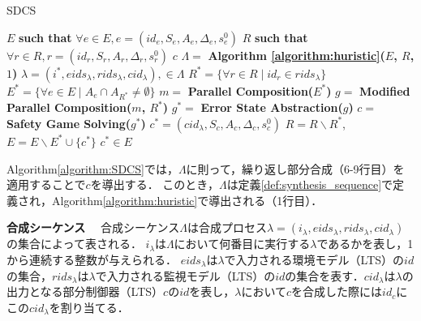 \begin{algorithm}[h]
\caption{SDCS}
\label{algorithm:SDCS}
\begin{algorithmic}[1]
\renewcommand{\algorithmicrequire}{\textbf{Input:}}
\renewcommand{\algorithmicensure}{\textbf{Output:}}
\REQUIRE $E$ {\bf such that} $\forall e \in E, e = (id_{e}, S_{e}, A_{e}, \Delta_{e}, s^0_{e})$
\REQUIRE $R$ {\bf such that} $\forall r \in R, r = (id_{r}, S_{r}, A_{r}, \Delta_{r}, s^0_{r})$
\ENSURE $c$
\STATE $\Lambda =$ {\bf Algorithm \ref{algorithm:huristic}($E$, $R$, $1$)}
    \STATE $\lambda = (i^*, eids_{\lambda}, rids_{\lambda}, cid_{\lambda}),  \in \Lambda$
    \STATE $R^* = \{\forall r \in R \mid id_{r} \in rids_{\lambda}\}$
    \STATE $E^* = \{\forall e \in E \mid A_{e} \cap A_{R^*} \neq \emptyset\}$
    \STATE $m   =$ {\bf Parallel Composition($E^*$)}
    \STATE $g   =$ {\bf Modified Parallel Composition($m$, $R^*$)}
    \STATE $g^* =$ {\bf Error State Abstraction($g$)}
    \STATE $c   =$ {\bf Safety Game Solving($g^*$)}
    \STATE $c^* = (cid_{\lambda}, S_{c}, A_{c}, \Delta_{c}, s^0_{c})$
    \STATE $R   = R \backslash R^*$,\;\;\ $E = E \backslash E^* \cup \{c^*\}$
\ENDFOR
{} $c^* \in E$
\end{algorithmic}
\end{algorithm}

Algorithm\ref{algorithm:SDCS}では，$\Lambda$に則って，繰り返し部分合成（6-9行目）を適用することで$c$を導出する．
このとき，$\Lambda$は定義\ref{def:synthesis_sequence}で定義され，Algorithm\ref{algorithm:huristic}で導出される（1行目）\cite{yamauchi:KBSE2024}．

\begin{dfn}{\textbf{合成シーケンス　}}
\label{def:synthesis_sequence}
    合成シーケンス$\Lambda$は合成プロセス$\lambda = (i_{\lambda}, eids_{\lambda}, rids_{\lambda}, cid_{\lambda})$の集合によって表される．
    $i_{\lambda}$は$\Lambda$において何番目に実行する$\lambda$であるかを表し，1から連続する整数が与えられる．
    $eids_{\lambda}$は$\lambda$で入力される環境モデル（LTS）の$id$の集合，$rids_{\lambda}$は$\lambda$で入力される監視モデル（LTS）の$id$の集合を表す．$cid_{\lambda}$は$\lambda$の出力となる部分制御器（LTS）$c$の$id$を表し，$\lambda$において$c$を合成した際には$id_{c}$にこの$cid_{\lambda}$を割り当てる．
\end{dfn}

